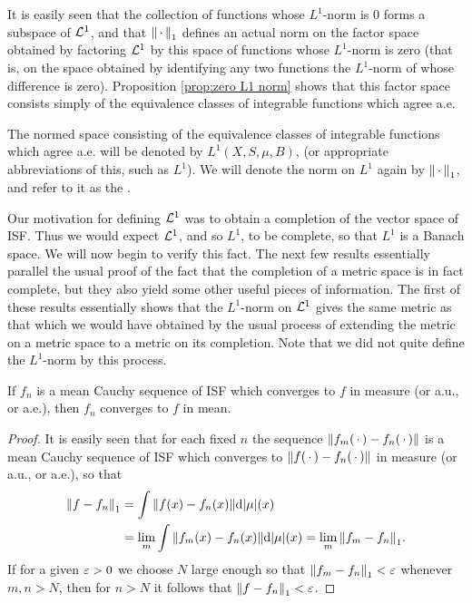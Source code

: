 It is easily seen that the collection of functions whose $L^1$-norm is $0$ forms a subspace of ${\cal L}^1$, and that $\norm{\,\cdot\,}_1$ defines an actual norm on the factor space obtained by factoring ${\cal L}^1$ by this space of functions whose $L^1$-norm is zero (that is, on the space obtained by identifying any two functions the $L^1$-norm of whose difference is zero). Proposition \ref{prop:zero L1 norm} shows that this factor space consists simply of the equivalence classes of integrable functions which agree a.e.

\begin{definition}
The normed space consisting of the equivalence classes of integrable functions which agree a.e. will be denoted by $L^1(X,S,\mu,B)$, (or appropriate abbreviations of this, such as $L^1$). We will denote the norm on $L^1$ again by $\norm{\,\cdot\,}_1$, and refer to it as the .
\end{definition}

Our motivation for defining ${\cal L}^1$ was to obtain a completion of the vector space of ISF. Thus we would expect ${\cal L}^1$, and so $L^1$, to be complete, so that $L^1$ is a Banach space. We will now begin to verify this fact. The next few results essentially parallel the usual proof of the fact that the completion of a metric space is in fact complete, but they also yield some other useful pieces of information. The first of these results essentially shows that the $L^1$-norm on ${\cal L}^1$ gives the same metric as that which we would have obtained by the usual process of extending the metric on a metric space to a metric on its completion. Note that we did not quite define the $L^1$-norm by this process.

\begin{lemma}\label{lem:ISF converge in measure implies mean}
If $f_n$ is a mean Cauchy sequence of ISF which converges to $f$ in measure (or a.u., or a.e.), then $f_n$ converges to $f$ in mean.
\end{lemma}

\begin{proof}
It is easily seen that for each fixed $n$ the sequence $\norm{f_m(\,\cdot\,)-f_n(\,\cdot\,)}$ is a mean Cauchy sequence of ISF which converges to $\norm{f(\,\cdot\,)-f_n(\,\cdot\,)}$ in measure (or a.u., or a.e.), so that
\begin{align*}
    \norm{f-f_n}_1&=\int\norm{f(x)-f_n(x)}\dd|\mu|(x)\\
    &=\lim_m\int\norm{f_m(x)-f_n(x)}\dd|\mu|(x)=\lim_m\norm{f_m-f_n}_1.
\end{align*}
If for a given $\varepsilon>0$ we choose $N$ large enough so that $\norm{f_m-f_n}_1<\varepsilon$ whenever $m,n>N$, then for $n>N$ it follows that $\norm{f-f_n}_1<\varepsilon$.
\end{proof}

